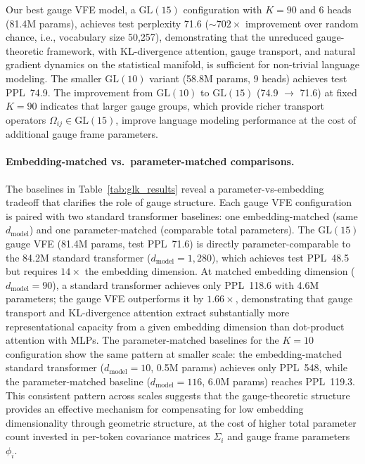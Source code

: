 \documentclass[twoside,11pt]{article}
\begin{document}
\begin{table}[h]
\label{tab:glk_results}
\end{table}

Our best gauge VFE model, a $\mathrm{GL}(15)$ configuration with $K = 90$ and 6 heads (81.4M params), achieves test perplexity 71.6 (${\sim}702\times$ improvement over random chance, i.e., vocabulary size 50{,}257), demonstrating that the unreduced gauge-theoretic framework, with KL-divergence attention, gauge transport, and natural gradient dynamics on the statistical manifold, is sufficient for non-trivial language modeling. The smaller $\mathrm{GL}(10)$ variant (58.8M params, 9 heads) achieves test PPL~74.9. The improvement from $\mathrm{GL}(10)$ to $\mathrm{GL}(15)$ (74.9 $\to$ 71.6) at fixed $K = 90$ indicates that larger gauge groups, which provide richer transport operators $\Omega_{ij} \in \mathrm{GL}(15)$, improve language modeling performance at the cost of additional gauge frame parameters.

\paragraph{Embedding-matched vs.\ parameter-matched comparisons.}
The baselines in Table~\ref{tab:glk_results} reveal a parameter-vs-embedding tradeoff that clarifies the role of gauge structure. Each gauge VFE configuration is paired with two standard transformer baselines: one embedding-matched (same $d_{\text{model}}$) and one parameter-matched (comparable total parameters). The $\mathrm{GL}(15)$ gauge VFE (81.4M params, test PPL~71.6) is directly parameter-comparable to the 84.2M standard transformer ($d_{\text{model}} = 1{,}280$), which achieves test PPL~48.5 but requires $14\times$ the embedding dimension. At matched embedding dimension ($d_{\text{model}} = 90$), a standard transformer achieves only PPL~118.6 with 4.6M parameters; the gauge VFE outperforms it by $1.66\times$, demonstrating that gauge transport and KL-divergence attention extract substantially more representational capacity from a given embedding dimension than dot-product attention with MLPs. The parameter-matched baselines for the $K\!=\!10$ configuration show the same pattern at smaller scale: the embedding-matched standard transformer ($d_{\text{model}} = 10$, 0.5M params) achieves only PPL~548, while the parameter-matched baseline ($d_{\text{model}} = 116$, 6.0M params) reaches PPL~119.3. This consistent pattern across scales suggests that the gauge-theoretic structure provides an effective mechanism for compensating for low embedding dimensionality through geometric structure, at the cost of higher total parameter count invested in per-token covariance matrices $\Sigma_i$ and gauge frame parameters $\phi_i$.
\end{document}
